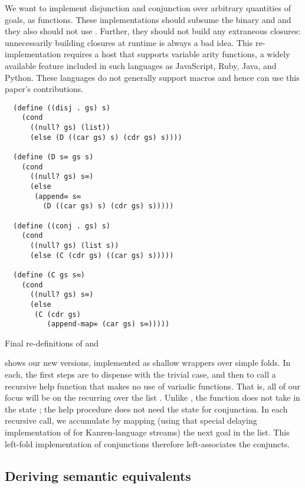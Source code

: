 \documentclass[sigplan,balance,pbalance,natbib=false]{acmart}
\begin{document}
We want to implement disjunction and conjunction over arbitrary
quantities of goals, as functions. These implementations should
subsume the binary  and  and they
also should not use . Further, they should not build
any extraneous closures: unnecessarily building closures at runtime is
always a bad idea. This re-implementation requires a host that
supports variable arity functions, a widely available feature included
in such languages as JavaScript, Ruby, Java, and Python. These
languages do not generally support macros and hence can use this
paper's contributions.

\begin{listing}
\begin{verbatim}
  (define ((disj . gs) s)
    (cond
      ((null? gs) (list))
      (else (D ((car gs) s) (cdr gs) s))))

  (define (D s∞ gs s)
    (cond
      ((null? gs) s∞)
      (else
       (append∞ s∞
         (D ((car gs) s) (cdr gs) s)))))

  (define ((conj . gs) s)
    (cond
      ((null? gs) (list s))
      (else (C (cdr gs) ((car gs) s)))))

  (define (C gs s∞)
    (cond
      ((null? gs) s∞)
      (else
       (C (cdr gs)
          (append-map∞ (car gs) s∞)))))
\end{verbatim}
  \caption{Final re-definitions of  and }\label{mnt:disj-reimplementation}
\end{listing}

 shows our new versions, implemented
as shallow wrappers over simple folds. In each, the first steps are to
dispense with the trivial case, and then to call a recursive help
function that makes no use of variadic functions. That is, all of our
focus will be on the recurring over the list .
Unlike , the function  does not take in
the state ; the help procedure does not need the state
for conjunction. In each recursive call, we accumulate by mapping
(using that special delaying implementation
of  for Kanren-language streams) the next goal
in the list. This left-fold implementation of conjunctions therefore
left-associates the conjuncts.

\subsection{Deriving semantic equivalents}
\end{document}
